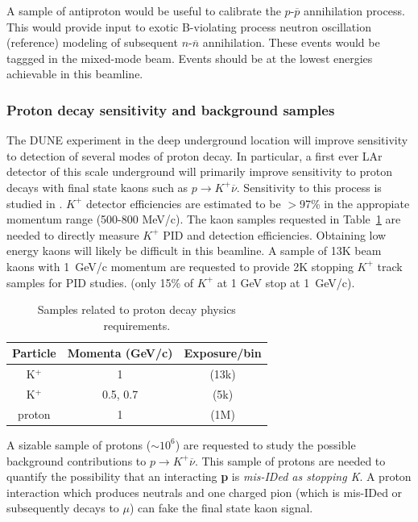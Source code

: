 A sample of antiproton would be useful to calibrate the $p$-$\overline{p}$ annihilation process. 
This would provide input to exotic B-violating process neutron oscillation (reference) modeling of 
subsequent  $n$-$\overline{n}$ annihilation. These events would be taggged in the mixed-mode beam.
Events should be at the lowest energies achievable in this beamline.


\subsubsection{Proton decay sensitivity and background samples}


The DUNE experiment in the deep underground location will improve sensitivity to detection of several modes of proton decay.
In particular, a first ever LAr detector of this scale underground will primarily improve sensitivity to 
proton decays with final state kaons such as  $p \rightarrow K^+ \overline{\nu}$. 
Sensitivity to this process is studied in \cite{bueno}. $K^+$ detector efficiencies are estimated to be $>$97\% in the
appropiate momentum range (500-800 MeV/c). The kaon samples requested in Table~\ref{pdktable} are needed to directly measure 
$K^+$ PID and detection efficiencies. Obtaining low energy kaons will likely be difficult in this beamline.
A sample of 13K beam kaons with 1~GeV/c momentum are requested to provide 2K stopping $K^+$ track samples for PID studies.
(only 15\% of $K^+$ at 1 GeV stop at 1~GeV/c).


\begin{table}[h]
\centering
\begin{tabular}{|c|c|c|}
\hline
Particle     & Momenta (GeV/c) & Exposure/bin  \\ \hline
\hline
K$^+$  &  1 & (13k)    \\ \hline
K$^+$  & 0.5, 0.7 & (5k)   \\ \hline
proton &  1  &  (1M)  \\ \hline
\end{tabular}\caption{Samples related to proton decay physics requirements.}
\label{pdktable}
\end{table}

A sizable sample of protons ($\sim 10^6$)
are requested to study the possible background contributions to  $p \rightarrow K^+ \overline{\nu}$.
This sample of  protons are needed to quantify the possibility that an interacting {\bf p} 
is  {\em mis-IDed as stopping K}. A proton interaction which produces neutrals and one charged pion 
(which is mis-IDed or subsequently decays to $\mu$) can fake the final state kaon signal.


